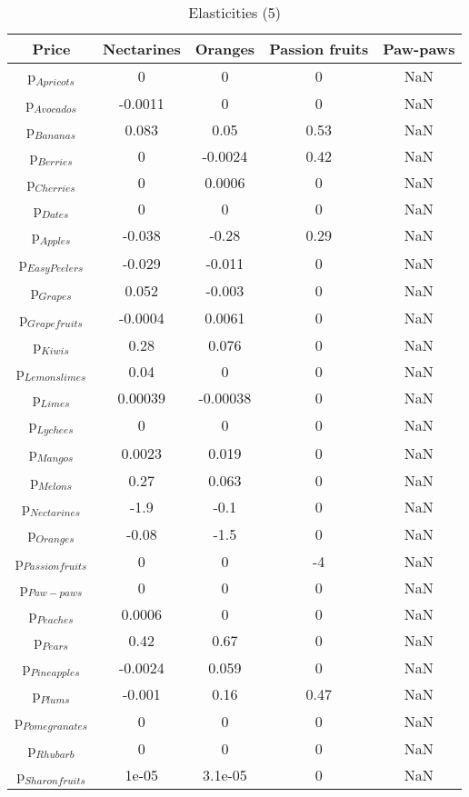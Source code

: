 \documentclass[11pt]{article}
\begin{document}
\begin{table}[h]
\caption{Elasticities (5)}
\label{Table: elasticities 5}
\begin{center}
\begin{tabular}{ccccc}
Price & Nectarines & Oranges & Passion fruits & Paw-paws \\ \hline
p$_{Apricots}$ & 0 & 0 & 0 & NaN \\ 
p$_{Avocados}$ & -0.0011 & 0 & 0 & NaN \\ 
p$_{Bananas}$ & 0.083 & 0.05 & 0.53 & NaN \\ 
p$_{Berries}$ & 0 & -0.0024 & 0.42 & NaN \\ 
p$_{Cherries}$ & 0 & 0.0006 & 0 & NaN \\ 
p$_{Dates}$ & 0 & 0 & 0 & NaN \\ 
p$_{Apples}$ & -0.038 & -0.28 & 0.29 & NaN \\ 
p$_{Easy Peelers}$ & -0.029 & -0.011 & 0 & NaN \\ 
p$_{Grapes}$ & 0.052 & -0.003 & 0 & NaN \\ 
p$_{Grapefruits}$ & -0.0004 & 0.0061 & 0 & NaN \\ 
p$_{Kiwis}$ & 0.28 & 0.076 & 0 & NaN \\ 
p$_{Lemonslimes}$ & 0.04 & 0 & 0 & NaN \\ 
p$_{Limes}$ & 0.00039 & -0.00038 & 0 & NaN \\ 
p$_{Lychees}$ & 0 & 0 & 0 & NaN \\ 
p$_{Mangos}$ & 0.0023 & 0.019 & 0 & NaN \\ 
p$_{Melons}$ & 0.27 & 0.063 & 0 & NaN \\ 
p$_{Nectarines}$ & -1.9 & -0.1 & 0 & NaN \\ 
p$_{Oranges}$ & -0.08 & -1.5 & 0 & NaN \\ 
p$_{Passion fruits}$ & 0 & 0 & -4 & NaN \\ 
p$_{Paw-paws}$ & 0 & 0 & 0 & NaN \\ 
p$_{Peaches}$ & 0.0006 & 0 & 0 & NaN \\ 
p$_{Pears}$ & 0.42 & 0.67 & 0 & NaN \\ 
p$_{Pineapples}$ & -0.0024 & 0.059 & 0 & NaN \\ 
p$_{Plums}$ & -0.001 & 0.16 & 0.47 & NaN \\ 
p$_{Pomegranates}$ & 0 & 0 & 0 & NaN \\ 
p$_{Rhubarb}$ & 0 & 0 & 0 & NaN \\ 
p$_{Sharon fruits}$ & 1e-05 & 3.1e-05 & 0 & NaN \\ 
\end{tabular}
\end{center}
\end{table}
\end{document}

